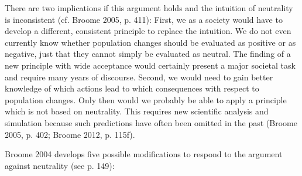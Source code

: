 There are two implications if this argument holds and the intuition of neutrality is inconsistent (cf. \label{ref:RNDvHVBymXoLa}Broome 2005, p. 411): First, we as a society would have to develop a different, consistent principle to replace the intuition. We do not even currently know whether population changes should be evaluated as positive or as negative, just that they cannot simply be evaluated as neutral. The finding of a new principle with wide acceptance would certainly present a major societal task and require many years of discourse. Second, we would need to gain better knowledge of which actions lead to which consequences with respect to population changes. Only then would we probably be able to apply a principle which is not based on neutrality. This requires new scientific analysis and simulation because such predictions have often been omitted in the past (\label{ref:RND54So3qk8SK}Broome 2005, p. 402; \label{ref:RNDJG5XuCbvIG}Broome 2012, p. 115f).  

\label{ref:RNDoGhae544eI}Broome 2004 develops five possible modifications to respond to the argument against neutrality (see p. 149):  

